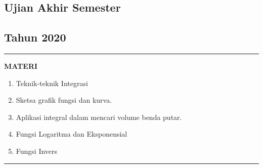 \begin{flushright}
    \section*{\Large{Ujian Akhir Semester}}
    \subsection*{Tahun 2020}
\end{flushright}


\vspace{0.5cm}\hrule height 2pt\vspace{0.5cm}


\begin{center}
\textbf{\large{MATERI}}
\begin{enumerate}[leftmargin=*, label={\arabic*}.]
\item Teknik-teknik Integrasi
\item Sketsa grafik fungsi dan kurva.
\item Aplikasi integral dalam mencari volume benda putar.
\item Fungsi Logaritma dan Eksponensial
\item Fungsi Invers
\end{enumerate}
\end{center}


\vspace{0.2cm}\hrule height 1pt\vspace{0.5cm}


